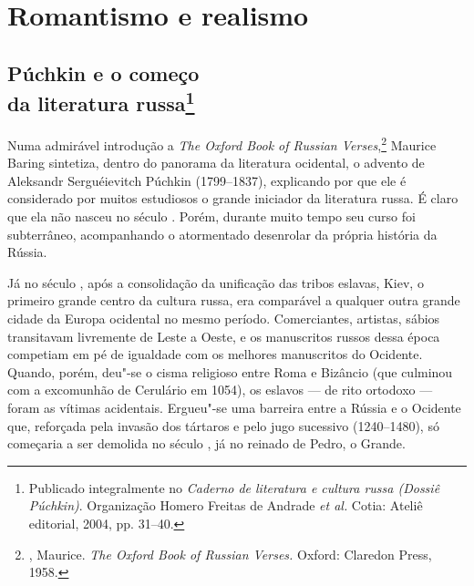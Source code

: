 
\part{Romantismo e realismo}

\chapter{Púchkin e o começo\\ da literatura russa\footnote{Publicado integralmente no \emph{Caderno de literatura e cultura russa (Dossiê Púchkin)}. Organização Homero Freitas de Andrade \emph{et al.} Cotia: Ateliê editorial, 2004, pp. 31--40.}}
\label{puchkin1}

Numa admirável introdução a \emph{The Oxford Book of Russian Verses},\footnote{, Maurice. \emph{The Oxford Book of Russian Verses.} Oxford: Claredon Press, 1958.}
Maurice Baring sintetiza, dentro do panorama da literatura ocidental, o
advento de Aleksandr Serguéievitch Púchkin (1799--1837), explicando por
que ele é considerado por muitos estudiosos o grande iniciador da
literatura russa. É claro que ela não nasceu no século . Porém, durante muito tempo seu curso foi subterrâneo, acompanhando o atormentado
desenrolar da própria história da Rússia.

Já no século , após a consolidação da unificação das tribos eslavas,
Kiev, o primeiro grande centro da cultura russa, era comparável a
qualquer outra grande cidade da Europa ocidental no mesmo período.
Comerciantes, artistas, sábios transitavam livremente de Leste a Oeste,
e os manuscritos russos dessa época competiam em pé de igualdade com os
melhores manuscritos do Ocidente. Quando, porém, deu"-se o cisma
religioso entre Roma e Bizâncio (que culmi­nou com a excomunhão de
Cerulário em 1054), os eslavos --- de rito ortodoxo --- foram as vítimas
acidentais. Ergueu"-se uma barreira entre a Rússia e o Ociden­te que,
reforçada pela invasão dos tártaros e pelo jugo sucessivo (1240--1480),
só começaria a ser demolida no século , já no reinado de
Pedro, o Grande.

